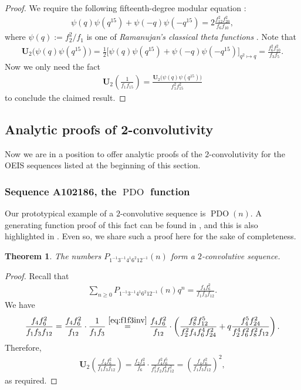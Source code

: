 \documentclass[12pt,reqno]{amsart}
\numberwithin{equation}{section}
\theoremstyle{plain}
\newtheorem{theorem}{Theorem}[section]
\theoremstyle{definition}
\theoremstyle{named}
\newcommand{\UU}{\mathbf{U}}
\newcommand{\PDO}{\operatorname{PDO}}
\begin{document}
\begin{proof}
	We require the following fifteenth-degree modular equation \cite[p.~377, Entry~9(iv)]{Ber91}:
	\begin{align*}
		\psi(q)\psi(q^{15}) + \psi(-q)\psi(-q^{15}) = 2\frac{f_{12}^2f_{20}^2}{f_6f_{10}},
	\end{align*}
	where $\psi(q):= f_2^2/f_1$ is one of \emph{Ramanujan's classical theta functions} \cite[p.~36, Entry~22(ii)]{Ber91}. Note that
	\begin{align*}
		\UU_2\big(\psi(q)\psi(q^{15})\big) = \frac{1}{2}\big[\psi(q)\psi(q^{15}) + \psi(-q)\psi(-q^{15})\big]_{q^2\mapsto q} = \frac{f_{6}^2f_{10}^2}{f_3f_{5}}.
	\end{align*}
	Now we only need the fact
	\begin{align*}
		\UU_2\left(\frac{1}{f_1 f_{15}}\right) = \frac{\UU_2\big(\psi(q)\psi(q^{15})\big)}{f_1^2 f_{15}^2}
	\end{align*}
	to conclude the claimed result.
\end{proof}

\subsection{Analytic proofs of 2-convolutivity}

Now we are in a position to offer analytic proofs of the $2$-convolutivity for the OEIS sequences listed at the beginning of this section.

\subsubsection{Sequence A102186, the $\PDO$ function}

Our prototypical example of a $2$-convolutive sequence is  $\PDO(n)$.  A generating function proof of this fact can be found in \cite{ALL2002}, and this is also highlighted in \cite{Sel2024_INTEGERS}.  Even so, we share such a proof here for the sake of completeness.

\begin{theorem}\label{th:A102186}
	The numbers $P_{1^{-1}3^{-1}4^{1}6^{2}12^{-1}}(n)$ form a $2$-convolutive sequence.
\end{theorem}

\begin{proof}
	Recall that
	\begin{align*}
		\sum_{n\ge 0} P_{1^{-1}3^{-1}4^{1}6^{2}12^{-1}}(n) q^n = \frac{f_4 f_6^2}{f_1 f_3 f_{12}}.
	\end{align*}
	We have
	\begin{align*}
		\frac{f_4 f_6^2}{f_1 f_3 f_{12}} = \frac{f_4 f_6^2}{f_{12}}\cdot \frac{1}{f_1 f_3} \overset{\eqref{eq:f1f3inv}}{=} \frac{f_4 f_6^2}{f_{12}}\cdot \left(\frac{f_8^2f_{12}^5}{f_2^2f_4f_6^4f_{24}^2}+q\frac{f_4^5f_{24}^2}{f_2^4f_6^2f_8^2f_{12}}\right).
	\end{align*}
	Therefore,
	\begin{align*}
		\UU_2\left(\frac{f_4 f_6^2}{f_1 f_3 f_{12}}\right) = \frac{f_2 f_3^2}{f_{6}}\cdot \frac{f_4^2f_{6}^5}{f_1^2f_2f_3^4f_{12}^2} = \left(\frac{f_4 f_6^2}{f_1 f_3 f_{12}}\right)^2,
	\end{align*}
	as required.
\end{proof}
\end{document}
